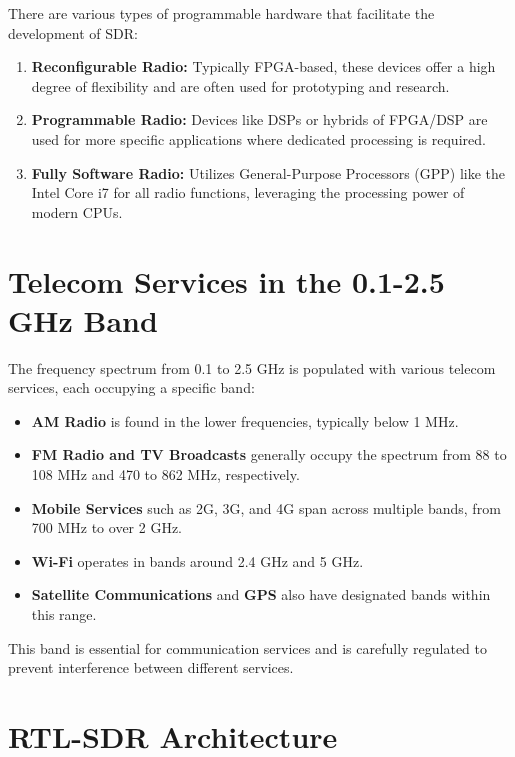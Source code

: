 There are various types of programmable hardware that facilitate the development of SDR:
\begin{enumerate}
    \item \textbf{Reconfigurable Radio:} Typically FPGA-based, these devices offer a high degree of flexibility and are often used for prototyping and research.
    \item \textbf{Programmable Radio:} Devices like DSPs or hybrids of FPGA/DSP are used for more specific applications where dedicated processing is required.
    \item \textbf{Fully Software Radio:} Utilizes General-Purpose Processors (GPP) like the Intel Core i7 for all radio functions, leveraging the processing power of modern CPUs.
\end{enumerate}

\section*{Telecom Services in the 0.1-2.5 GHz Band}

The frequency spectrum from 0.1 to 2.5 GHz is populated with various telecom services, each occupying a specific band:
\begin{itemize}
    \item \textbf{AM Radio} is found in the lower frequencies, typically below 1 MHz.
    \item \textbf{FM Radio and TV Broadcasts} generally occupy the spectrum from 88 to 108 MHz and 470 to 862 MHz, respectively.
    \item \textbf{Mobile Services} such as 2G, 3G, and 4G span across multiple bands, from 700 MHz to over 2 GHz.
    \item \textbf{Wi-Fi} operates in bands around 2.4 GHz and 5 GHz.
    \item \textbf{Satellite Communications} and \textbf{GPS} also have designated bands within this range.
\end{itemize}
This band is essential for communication services and is carefully regulated to prevent interference between different services.

\section*{RTL-SDR Architecture}

